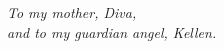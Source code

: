 \documentclass[../thesis.tex]{subfiles}
\begin{document}
	\newpage
	\null

	\vspace{6cm}

	\begin{center}
		\textit{
		To my mother, Diva, \\
		and to my guardian angel, Kellen.}
	\end{center}


	\begin{flushright}
		
		
	\end{flushright}
	
	\vspace{6cm}
	
	\thispagestyle{empty}	
\end{document}
